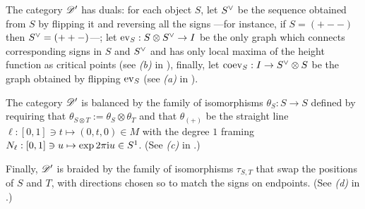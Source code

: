 The category $\mathscr{D}'_{}$ has duals: for each object $S$, let $\rdl{S}$ be
the sequence obtained from $S$ by flipping it and reversing all the
signs ---for instance, if $S = (+--)$ then $\rdl{S} = (++-)$---; let
$\ev_S: S\otimes\rdl{S} \to I$ be the only graph which connects corresponding
signs in $S$ and $\rdl{S}$ and has only local maxima of the height
function as critical points (see \textsl{(b)} in ),
finally, let $\coev_S : I \to \rdl{S} \otimes S$ be the graph obtained by
flipping $\operatorname{ev}_S$ (see \textsl{(a)} in ).

The category $\mathscr{D}'_{}$ is balanced by the family of isomorphisms $\theta_S: S
\to S$ defined by requiring that $\theta_{S\otimes T} := \theta_S \otimes \theta_T$ and
that $\theta_{(+)}$ be the straight line $\ell: [0,1] \ni t \mapsto (0,t,0) \in M$
with the degree $1$ framing $N_\ell: [0,1] \ni u \mapsto \exp 2\pi\mathrm{i} u \in
S^1$. (See \textsl{(c)} in .)

Finally, $\mathscr{D}'_{}$ is braided by the family of isomorphisms $\tau_{S,T}$
that swap the positions of $S$ and $T$, with directions chosen so to
match the signs on endpoints. (See \textsl{(d)} in
.)

